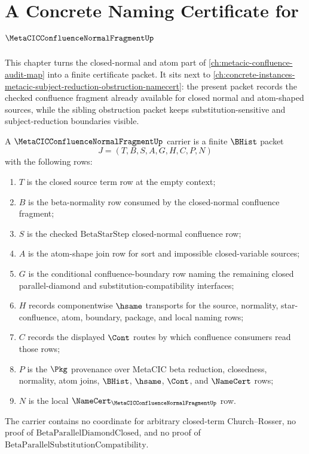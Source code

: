\chapter{A Concrete Naming Certificate for $\MetaCICConfluenceNormalFragmentUp$}
\label{ch:concrete-instances-metacicconfluencenormalfragment-namecert}

This chapter turns the closed-normal and atom part of
\autoref{ch:metacic-confluence-audit-map} into a finite certificate packet. It
sits next to
\autoref{ch:concrete-instances-metacic-subject-reduction-obstruction-namecert}:
the present packet records the checked confluence fragment already available
for closed normal and atom-shaped sources, while the sibling obstruction packet
keeps substitution-sensitive and subject-reduction boundaries visible.

\begin{definition}
\label{def:metacic-confluence-normal-fragment-carrier}
A $\MetaCICConfluenceNormalFragmentUp$ carrier is a finite $\BHist$ packet
$$
J=(T,B,S,A,G,H,C,P,N)
$$
with the following rows:
\begin{enumerate}
\item $T$ is the closed source term row at the empty context;
\item $B$ is the beta-normality row consumed by the closed-normal confluence
fragment;
\item $S$ is the checked $\mathrm{BetaStarStep}$ closed-normal confluence row;
\item $A$ is the atom-shape join row for sort and impossible closed-variable
sources;
\item $G$ is the conditional confluence-boundary row naming the remaining
closed parallel-diamond and substitution-compatibility interfaces;
\item $H$ records componentwise $\hsame$ transports for the source, normality,
star-confluence, atom, boundary, package, and local naming rows;
\item $C$ records the displayed $\Cont$ routes by which confluence consumers
read those rows;
\item $P$ is the $\Pkg$ provenance over MetaCIC beta reduction, closedness,
normality, atom joins, $\BHist$, $\hsame$, $\Cont$, and $\NameCert$ rows;
\item $N$ is the local $\NameCert_{\MetaCICConfluenceNormalFragmentUp}$ row.
\end{enumerate}
The carrier contains no coordinate for arbitrary closed-term Church--Rosser,
no proof of $\mathrm{BetaParallelDiamondClosed}$, and no proof of
$\mathrm{BetaParallelSubstitutionCompatibility}$.
\end{definition}

